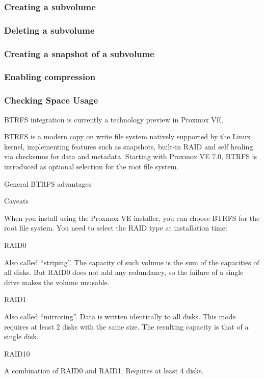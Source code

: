 \subsubsection{Creating a subvolume}

\subsubsection{Deleting a subvolume}

\subsubsection{Creating a snapshot of a subvolume}

\subsubsection{Enabling compression}

\subsubsection{Checking Space Usage}

BTRFS integration is currently a technology preview in Proxmox VE.

BTRFS is a modern copy on write file system natively supported by the Linux kernel, implementing features such as snapshots, built-in RAID and self healing via checksums for data and metadata. Starting with Proxmox VE 7.0, BTRFS is introduced as optional selection for the root file system.

General BTRFS advantages

Caveats

When you install using the Proxmox VE installer, you can choose BTRFS for the root file system. You need to select the RAID type at installation time:

RAID0

Also called “striping”. The capacity of such volume is the sum of the capacities of all disks. But RAID0 does not add any redundancy, so the failure of a single drive makes the volume unusable.

RAID1

Also called “mirroring”. Data is written identically to all disks. This mode requires at least 2 disks with the same size. The resulting capacity is that of a single disk.

RAID10

A combination of RAID0 and RAID1. Requires at least 4 disks.

